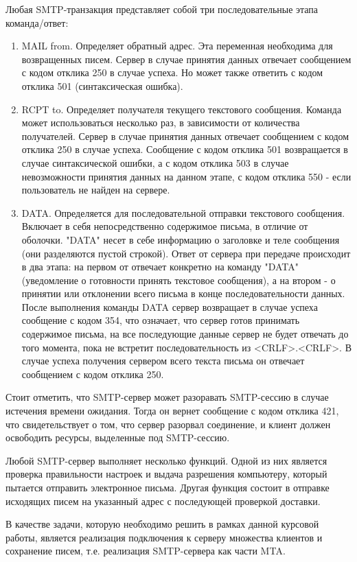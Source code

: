 \documentclass[a4paper,12pt]{report}
\begin{document}
	Любая SMTP-транзакция представляет собой три последовательные этапа команда/ответ:
	\begin{enumerate}
		\item MAIL from. Определяет обратный адрес. Эта переменная необходима для возвращенных писем. Сервер в случае принятия данных отвечает сообщением с кодом отклика 250 в случае успеха. Но может также ответить с кодом отклика 501 (синтаксическая ошибка). 
		\item RCPT to. Определяет получателя текущего текстового сообщения. Команда может использоваться несколько раз, в зависимости от количества получателей. Сервер в случае принятия данных отвечает сообщением с кодом отклика 250 в случае успеха. Сообщение с кодом отклика 501 возвращается в случае синтаксической ошибки, а с кодом отклика 503 в случае невозможности принятия данных на данном этапе, с кодом отклика 550 - если пользователь не найден на сервере.
		\item DATA. Определяется для последовательной отправки текстового сообщения. Включает в себя непосредственно содержимое письма, в отличие от оболочки. "DATA" несет в себе информацию о заголовке и теле сообщения (они разделяются пустой строкой). Ответ от сервера при передаче происходит в два этапа: на первом от отвечает конкретно на команду "DATA" (уведомление о готовности принять текстовое сообщения), а на втором - о принятии или отклонении всего письма в конце последовательности данных. После выполнения команды DATA сервер возвращает в случае успеха сообщение с кодом 354, что означает, что сервер готов принимать содержимое письма, на все последующие данные сервер не будет отвечать до того момента, пока не встретит последовательность из <CRLF>.<CRLF>. В случае успеха получения сервером всего текста письма он отвечает сообщением с кодом отклика 250.
	\end{enumerate}

	Стоит отметить, что SMTP-сервер может разоравать SMTP-сессию в случае истечения времени ожидания. 
	Тогда он вернет сообщение с кодом отклика 421, что свидетельствует о том, что сервер разорвал соединение,
	 и клиент должен освободить ресурсы, выделенные под SMTP-сессию.  

	Любой SMTP-сервер выполняет несколько функций. 
	Одной из них является проверка правильности настроек и выдача разрешения компьютеру, который пытается отправить электронное письма. 
	Другая функция состоит в отправке исходящих писем на указанный адрес с последующей проверкой доставки. 
	
	В качестве задачи, которую необходимо решить в рамках данной курсовой работы, является реализация подключения к серверу множества клиентов и сохранение писем, 
	т.е. реализация SMTP-сервера как части MTA.
	 
\end{document}
